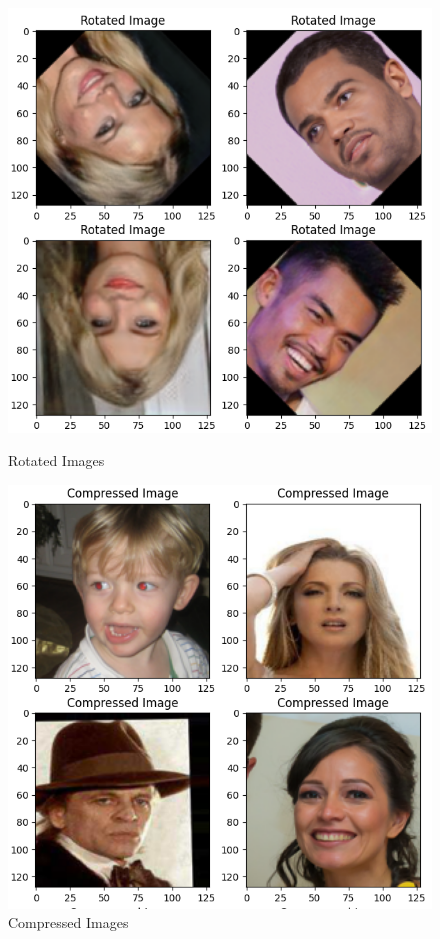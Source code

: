 	\begin{figure}[ht]
		\centering
		\begin{minipage}{0.45\textwidth}
				\centering
				\includegraphics[width=0.95\linewidth]{./img/rotated.png}
				\caption{Rotated Images}
		\end{minipage}
		\hfill
		\begin{minipage}{0.45\textwidth}
				\centering
				\includegraphics[width=0.95\linewidth]{./img/compressed.png}
				\caption{Compressed Images}
		\end{minipage}


\end{figure}
